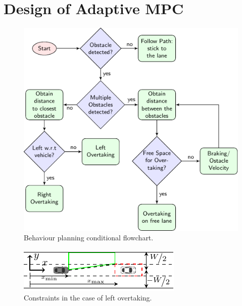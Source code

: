 \section{Design of Adaptive MPC}
\begin{figure}[!h]
	\centering
	\includegraphics[width=\textwidth]{../figure/flowchart/flowchart.pdf}
	\caption{Behaviour planning conditional flowchart.}
	\label{fig:flowchart}
\end{figure}
\begin{figure}[!h]
	\centering
	\includegraphics[width=\textwidth]{../figure/constraint/constraint.pdf}
	\caption{Constraints in the case of left overtaking.}
	\label{fig:constraint}
\end{figure}


